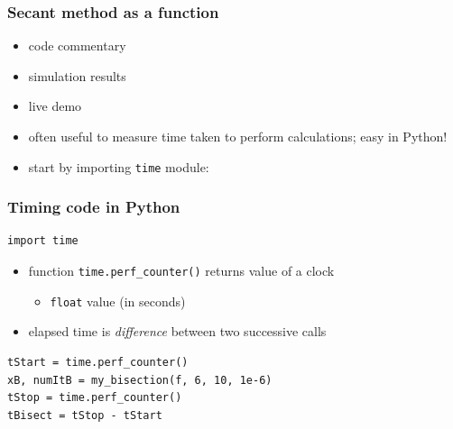 \documentclass[english,14pt]{beamer}
\begin{document}

\begin{frame}[fragile]

\frametitle{Secant method as a function}

\begin{itemize}
	\item code commentary
	\item simulation results
	\item live demo
\end{itemize}

\end{frame}


\begin{frame}[fragile]

\begin{itemize}
	\item often useful to measure time taken to perform calculations; easy in Python!
	\item start by importing \texttt{time} module:
\end{itemize}

\frametitle{Timing code in Python}
\begin{lstlisting}[style=CStyle,basicstyle=\scriptsize]
import time
\end{lstlisting}

\begin{itemize}
	\item function \texttt{time.perf\_counter()} returns value of a clock
	\begin{itemize}
		\item \texttt{float} value (in seconds) 
	\end{itemize}
	\item elapsed time is \emph{difference} between two successive calls
\end{itemize}

\begin{lstlisting}[style=CStyle,basicstyle=\scriptsize]
tStart = time.perf_counter()
xB, numItB = my_bisection(f, 6, 10, 1e-6)
tStop = time.perf_counter()
tBisect = tStop - tStart
\end{lstlisting}

\end{frame}

\end{document}
